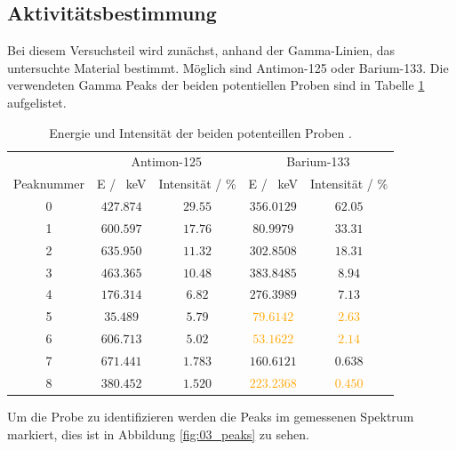 \subsection{Aktivitätsbestimmung}
Bei diesem Versuchsteil wird zunächst, anhand der Gamma-Linien, das untersuchte Material bestimmt.
Möglich sind Antimon-125 oder Barium-133.
Die verwendeten Gamma Peaks der beiden potentiellen Proben sind in Tabelle \ref{tab:Ba_133Sb_125} aufgelistet.
\FloatBarrier
\begin{table}
  \centering
  \caption{Energie und Intensität der beiden potenteillen Proben \cite{Gamma_lit}.}
  \label{tab:Ba_133Sb_125}
  \begin{tabular}{c c c c c}
    \toprule
    & \multicolumn{2}{c}{Antimon-125} & \multicolumn{2}{c}{Barium-133} \\
    \cmidrule(lr){2-3}\cmidrule(lr){4-5}
    Peaknummer & E / \SI{}{\kilo\eV} & Intensität / \%& E / \SI{}{\kilo\eV} & Intensität / \%\\
    \midrule
    0&$\num{427.874}$&$\num{29.55}$&$\num{356.0129}$&$\num{62.05}$\\
    1&$\num{600.597}$&$\num{17.76}$&$\num{80.9979}$&$\num{33.31}$\\
    2&$\num{635.950}$&$\num{11.32}$&$\num{302.8508}$&$\num{18.31}$\\
    3&$\num{463.365}$&$\num{10.48}$&$\num{383.8485}$&$\num{8.94}$\\
    4&$\num{176.314}$&$\num{6.82}$ &$\num{276.3989}$&$\num{7.13}$\\
    5&$\num{35.489}$&$\num{5.79}$  &\textcolor{orange}{$\num{79.6142}$}&\textcolor{orange}{$\num{2.63}$}\\
    6&$\num{606.713}$&$\num{5.02}$ &\textcolor{orange}{$\num{53.1622}$}&\textcolor{orange}{$\num{2.14}$}\\
    7&$\num{671.441}$&$\num{1.783}$&$\num{160.6121}$&$\num{0.638}$\\
    8&$\num{380.452}$&$\num{1.520}$&\textcolor{orange}{$\num{223.2368}$}&\textcolor{orange}{$\num{0.450}$}\\
    \bottomrule
  \end{tabular}
\end{table}
\FloatBarrier
Um die Probe zu identifizieren werden die Peaks im gemessenen Spektrum markiert, dies ist in Abbildung \ref{fig:03_peaks} zu sehen.
\FloatBarrier
